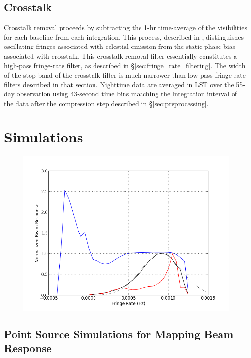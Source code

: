 \documentclass[twocolumn,apj,numberedappendix]{emulateapj}
\begin{document}
\subsection{Crosstalk}

Crosstalk removal proceeds by subtracting the
1-hr time-average of the visibilities for each baseline from each integration.  This process,
described in \citet{parsons_et_al2010}, distinguishes oscillating fringes associated with 
celestial emission from the static phase bias associated with crosstalk. This crosstalk-removal
filter essentially constitutes a high-pass fringe-rate filter, as described in \S\ref{sec:fringe_rate_filtering}.
The width of the stop-band of the crosstalk filter is much narrower than low-pass fringe-rate filters described in
that section.
Nighttime data are averaged in LST over the 55-day observation using 43-second
time bins matching the integration interval of the data after the compression step described
in \S\ref{sec:preprocessing}.


\section{Simulations}
\label{sec:sim}

\begin{figure}\centering
\includegraphics[width=.9\columnwidth]{plots/fringe_wgts.png}
\caption{
}\label{fig:fringe_wgts}
\end{figure}

\subsection{Point Source Simulations for Mapping Beam Response}
\label{sec:sim_pnt}
\end{document}
